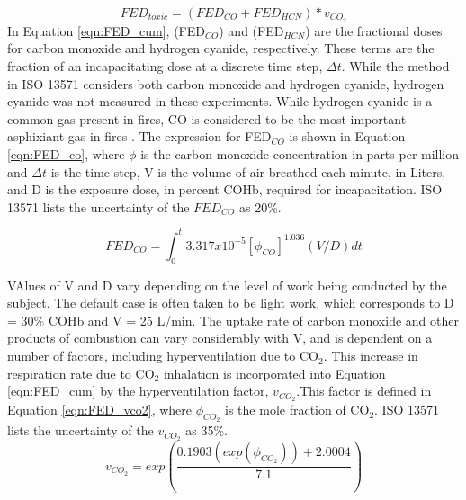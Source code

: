 \documentclass[12pt,oneside]{article}
\begin{document}
\begin{equation}\label{eqn:FED_cum}FED_{toxic}=(FED_{CO}+FED_{HCN})*v_{CO_2}\end{equation}
In Equation \ref{eqn:FED_cum},  (FED$_{CO}$) and  (FED$_{HCN}$) are the fractional doses for carbon monoxide and hydrogen cyanide, respectively. These terms are the fraction of an incapacitating dose at a discrete time step, $\Delta t$. While the method in ISO 13571 considers both carbon monoxide and hydrogen cyanide, hydrogen cyanide was not measured in these experiments. While hydrogen cyanide is a common gas present in fires, CO is considered to be the most important asphixiant gas in fires \cite{SFPE:Purser}. The expression for FED$_{CO}$ is shown in Equation \ref{eqn:FED_co}, where $\phi$ is the carbon monoxide concentration in parts per million and $\Delta t $ is the time step, V is the volume of air breathed each minute, in Liters, and D is the exposure dose, in percent COHb, required for incapacitation. ISO 13571 \cite{ISO13571} lists the uncertainty of the $FED_{CO}$ as 20\%.

\begin{equation}\label{eqn:FED_co}FED_{CO} = \int_{0}^{t} 3.317 x 10^{-5} [\phi_{CO}]^{1.036}(V/D)dt\end{equation}

VAlues of V and D vary depending on the level of work being conducted by the subject. The default case is often taken to be light work, which corresponds to D = 30\% COHb and V = 25 L/min. The uptake rate of carbon monoxide and other products of combustion can vary considerably with V, and is dependent on a number of factors, including hyperventilation due to CO$_2$. This increase in respiration rate due to CO$_2$ inhalation is incorporated into Equation \ref{eqn:FED_cum} by the hyperventilation factor, $v_{CO_2}$.This factor is defined in Equation \ref{eqn:FED_vco2}, where $\phi_{CO_2}$ is the mole fraction of CO$_2$. ISO 13571 \cite{ISO13571} lists the uncertainty of the $v_{CO_2}$ as 35\%.
\begin{equation}\label{eqn:FED_vco2}v_{CO_2}=exp(\frac{0.1903 (exp(\phi_{CO_2}))+2.0004}{7.1})\end{equation}
\end{document}

